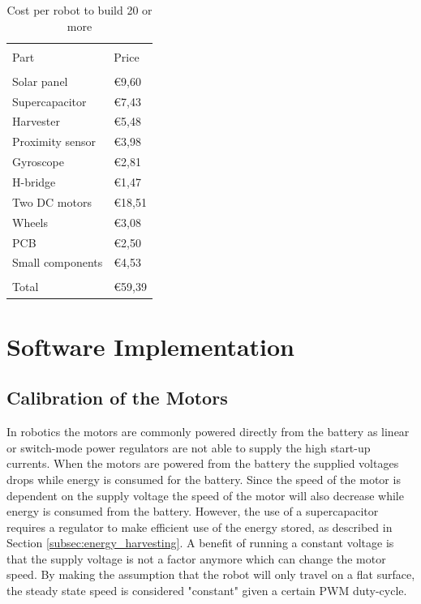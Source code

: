 \begin{table}[t]
	\centering
	\caption{Cost per robot to build 20 or more}
	\label{tab:cost_robot}
	\begin{tabularx}{0.7\textwidth}{l@{\hskip 0.6in}l} 
		\hline
		\\[-1em]
		Part & Price \\
		\hline\hline
		\\[-1em]
		Solar panel & \euro9,60\\
		Supercapacitor & \euro7,43\\
		Harvester & \euro5,48 \\
		Proximity sensor & \euro3,98 \\
		Gyroscope & \euro2,81\\	
		H-bridge & \euro1,47 \\
		Two DC motors & \euro18,51 \\
		Wheels & \euro3,08\\
		PCB & \euro2,50 \\
		Small components & \euro4,53\\
		\hline
		\\[-1em]
		Total & \euro59,39 \\
		\hline
	\end{tabularx}
\end{table}


\section{Software Implementation}

\subsection{Calibration of the Motors}
\label{subsub:motor_calib}

In robotics the motors are commonly powered directly from the battery as linear or switch-mode power regulators are not able to supply the high start-up currents.
When the motors are powered from the battery the supplied voltages drops while energy is consumed for the battery.
Since the speed of the motor is dependent on the supply voltage the speed of the motor will also decrease while energy is consumed from the battery.
However, the use of a supercapacitor requires a regulator to make efficient use of the energy stored, as described in Section \ref{subsec:energy_harvesting}.
A benefit of running a constant voltage is that the supply voltage is not a factor anymore which can change the motor speed.
By making the assumption that the robot will only travel on a flat surface, the steady state speed is considered "constant" given a certain PWM duty-cycle.


